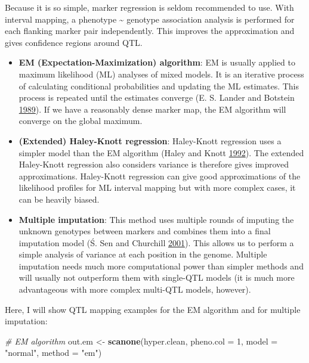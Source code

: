 \documentclass[12pt,]{book}
\newenvironment{Shaded}{\begin{snugshade}}{\end{snugshade}}
\newcommand{\KeywordTok}[1]{\textcolor[rgb]{0.13,0.29,0.53}{\textbf{{#1}}}}
\newcommand{\DataTypeTok}[1]{\textcolor[rgb]{0.13,0.29,0.53}{{#1}}}
\newcommand{\DecValTok}[1]{\textcolor[rgb]{0.00,0.00,0.81}{{#1}}}
\newcommand{\StringTok}[1]{\textcolor[rgb]{0.31,0.60,0.02}{{#1}}}
\newcommand{\CommentTok}[1]{\textcolor[rgb]{0.56,0.35,0.01}{\textit{{#1}}}}
\newcommand{\NormalTok}[1]{{#1}}
\providecommand{\tightlist}{%
  \setlength{\itemsep}{0pt}\setlength{\parskip}{0pt}}
\theoremstyle{definition}
\theoremstyle{definition}
\theoremstyle{remark}
\begin{document}
Because it is so simple, marker regression is seldom recommended to use.
With interval mapping, a phenotype \textasciitilde{} genotype
association analysis is performed for each flanking marker pair
independently. This improves the approximation and gives confidence
regions around QTL.

\begin{itemize}
\tightlist
\item
  \textbf{EM (Expectation-Maximization) algorithm}: EM is usually
  applied to maximum likelihood (ML) analyses of mixed models. It is an
  iterative process of calculating conditional probabilities and
  updating the ML estimates. This process is repeated until the
  estimates converge (E. S. Lander and Botstein
  \protect\hyperlink{ref-Lander185}{1989}). If we have a reasonably
  dense marker map, the EM algorithm will converge on the global
  maximum.
\item
  \textbf{(Extended) Haley-Knott regression}: Haley-Knott regression
  uses a simpler model than the EM algorithm (Haley and Knott
  \protect\hyperlink{ref-Haley1992}{1992}). The extended Haley-Knott
  regression also considers variance is therefore gives improved
  approximations. Haley-Knott regression can give good approximations of
  the likelihood profiles for ML interval mapping but with more complex
  cases, it can be heavily biased.
\item
  \textbf{Multiple imputation}: This method uses multiple rounds of
  imputing the unknown genotypes between markers and combines them into
  a final imputation model (Ś. Sen and Churchill
  \protect\hyperlink{ref-Sen371}{2001}). This allows us to perform a
  simple analysis of variance at each position in the genome. Multiple
  imputation needs much more computational power than simpler methods
  and will usually not outperform them with single-QTL models (it is
  much more advantageous with more complex multi-QTL models, however).
\end{itemize}

Here, I will show QTL mapping examples for the EM algorithm and for
multiple imputation:

\begin{Shaded}
\begin{Highlighting}[]
\CommentTok{# EM algorithm}
\NormalTok{out.em <-}\StringTok{ }\KeywordTok{scanone}\NormalTok{(hyper.clean, }\DataTypeTok{pheno.col =} \DecValTok{1}\NormalTok{, }\DataTypeTok{model =} \StringTok{"normal"}\NormalTok{, }
		  \DataTypeTok{method =} \StringTok{"em"}\NormalTok{)}
\end{Highlighting}
\end{Shaded}
\end{document}

